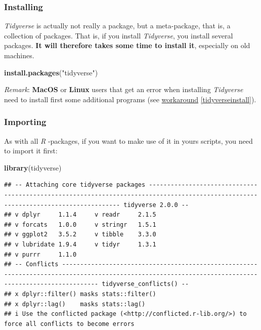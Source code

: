 \documentclass[
]{scrartcl}
\newenvironment{Shaded}{\begin{snugshade}}{\end{snugshade}}
\newcommand{\FunctionTok}[1]{\textcolor[rgb]{0.13,0.29,0.53}{\textbf{#1}}}
\newcommand{\NormalTok}[1]{#1}
\newcommand{\StringTok}[1]{\textcolor[rgb]{0.31,0.60,0.02}{#1}}
\begin{document}
\subsubsection*{Installing}\label{installing}

\emph{Tidyverse} is actually not really a package, but a meta-package, that is, a collection of packages. That is, if you install \emph{Tidyverse}, you install several packages. \textbf{It will therefore takes some time to install it}, especially on old machines.

\begin{Shaded}
\begin{Highlighting}[]
\FunctionTok{install.packages}\NormalTok{(}\StringTok{"tidyverse"}\NormalTok{)}
\end{Highlighting}
\end{Shaded}

\emph{Remark}: \textbf{MacOS} or \textbf{Linux} users that get an error when installing \emph{Tidyverse} need to install first some additional programs (see \hyperref[tidyverseinstall]{workaround} \ref{tidyverseinstall}).

\subsubsection*{Importing}\label{importing}

As with all \emph{R} -packages, if you want to make use of it in yours scripts, you need to import it first:

\begin{Shaded}
\begin{Highlighting}[]
\FunctionTok{library}\NormalTok{(tidyverse)}
\end{Highlighting}
\end{Shaded}

\begin{verbatim}
## -- Attaching core tidyverse packages ------------------------------------------------------------------------------------------------------------------------------------ tidyverse 2.0.0 --
## v dplyr     1.1.4     v readr     2.1.5
## v forcats   1.0.0     v stringr   1.5.1
## v ggplot2   3.5.2     v tibble    3.3.0
## v lubridate 1.9.4     v tidyr     1.3.1
## v purrr     1.1.0     
## -- Conflicts ------------------------------------------------------------------------------------------------------------------------------------------------------ tidyverse_conflicts() --
## x dplyr::filter() masks stats::filter()
## x dplyr::lag()    masks stats::lag()
## i Use the conflicted package (<http://conflicted.r-lib.org/>) to force all conflicts to become errors
\end{verbatim}
\end{document}
